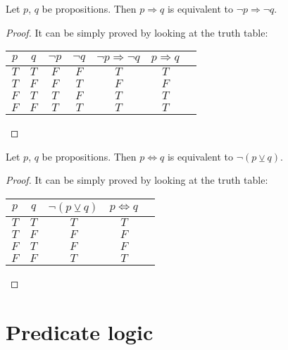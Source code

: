     \begin{theorem}
        Let $p$, $q$ be propositions. Then $p \Rightarrow q$ is equivalent to $\lnot p \Rightarrow \lnot q$.
    \end{theorem}
    \begin{proof}
        It can be simply proved by looking at the truth table:
        \begin{table}[h]
            \centering
            \begin{tabular}{c | c || c | c | c | c | c }
                $p$ & $q$ & $\lnot p$ & $\lnot q$ & $\lnot p \Rightarrow \lnot q$ & $p \Rightarrow q$ \\
                \hline
                \hline
                $T$ & $T$ & $F$ & $F$ & $T$ & $T$ \\
                $T$ & $F$ & $F$ & $T$ & $F$ & $F$ \\
                $F$ & $T$ & $T$ & $F$ & $T$ & $T$ \\
                $F$ & $F$ & $T$ & $T$ & $T$ & $T$ \\
            \end{tabular}
        \end{table}
    \end{proof}

    \begin{theorem}
        Let $p$, $q$ be propositions. Then $p \Leftrightarrow q$ is equivalent to $\lnot (p \veebar q)$.
    \end{theorem}
    \begin{proof}
        It can be simply proved by looking at the truth table:
        \begin{table}[h]
            \centering
            \begin{tabular}{c | c || c | c | c }
                $p$ & $q$ & $\lnot (p \veebar q)$ & $p \Leftrightarrow q$ \\
                \hline
                \hline
                $T$ & $T$ & $T$ & $T$ \\
                $T$ & $F$ & $F$ & $F$ \\
                $F$ & $T$ & $F$ & $F$ \\
                $F$ & $F$ & $T$ & $T$ \\
            \end{tabular}
        \end{table}
    \end{proof}

\section{Predicate logic}

